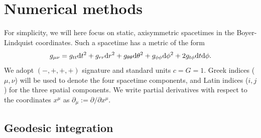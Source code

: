 \section{Numerical methods}

For simplicity, we will here focus on static, axisymmetric spacetimes in the Boyer-Lindquist coordinates. Such a spacetime has a metric of the form 
\begin{equation}
\label{eq:static_axisymmetric_metric}
    g_{\mu\nu} 
    = g_{tt} \text{d} t^2 
    + g_{rr} \text{d} r^2 
    + g_{\theta\theta} \text{d} \theta^2 
    + g_{\phi\phi} \text{d} \phi^2 
    + 2g_{t\phi} \text{d} t \text{d} \phi.
\end{equation}
We adopt $(-, +, +, +)$ signature and standard units $c = G = 1$. Greek indices ($\mu, \nu$) will be used to denote the four spacetime components, and Latin indices ($i, j$) for the three spatial components. We write partial derivatives with respect to the coordinates $x^\mu$ as $\partial_\mu := \partial / \partial x^\mu$.


\subsection{Geodesic integration}

